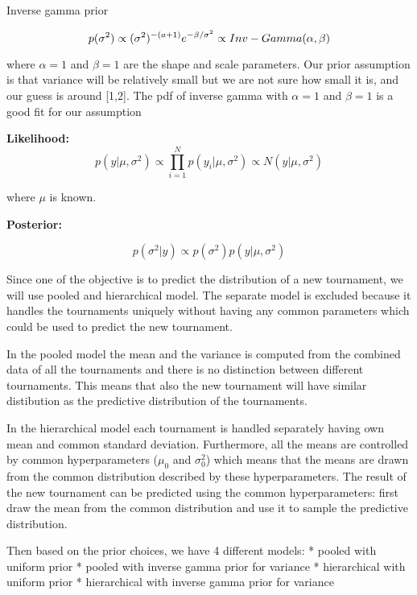\documentclass[11pt]{article}
\begin{document}
Inverse gamma prior

\begin{equation*}  
p(\sigma^2) \propto (\sigma^2)^{-(a+1)}e^{-\beta/\sigma^2} \propto Inv-Gamma(\alpha, \beta) \\
\end{equation*}

where \(\alpha=1\) and \(\beta=1\) are the shape and scale parameters.
Our prior assumption is that variance will be relatively small but we
are not sure how small it is, and our guess is around {[}1,2{]}. The pdf
of inverse gamma with \(\alpha=1\) and \(\beta=1\) is a good fit for our
assumption

\textbf{Likelihood:} \begin{equation*}
p(y|\mu,\sigma^2) \propto \prod_{i=1}^{N} p(y_i | \mu, \sigma^2) \propto N(y | \mu, \sigma^2) 
\end{equation*}

where \(\mu\) is known.

\textbf{Posterior:}

\begin{equation*}
p(\sigma^2 | y) \propto p(\sigma^2)p(y|\mu, \sigma^2)
\end{equation*}

Since one of the objective is to predict the distribution of a new
tournament, we will use pooled and hierarchical model. The separate
model is excluded because it handles the tournaments uniquely without
having any common parameters which could be used to predict the new
tournament.

In the pooled model the mean and the variance is computed from the
combined data of all the tournaments and there is no distinction between
different tournaments. This means that also the new tournament will have
similar distibution as the predictive distribution of the tournaments.

In the hierarchical model each tournament is handled separately having
own mean and common standard deviation. Furthermore, all the means are
controlled by common hyperparameters (\(\mu_0\) and \(\sigma^2_0\))
which means that the means are drawn from the common distribution
described by these hyperparameters. The result of the new tournament can
be predicted using the common hyperparameters: first draw the mean from
the common distribution and use it to sample the predictive
distribution.

Then based on the prior choices, we have 4 different models: * pooled
with uniform prior * pooled with inverse gamma prior for variance *
hierarchical with uniform prior * hierarchical with inverse gamma prior
for variance
\end{document}
